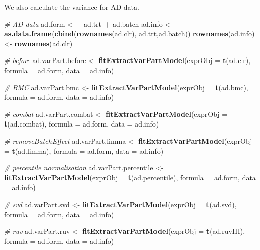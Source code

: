 \documentclass[]{book}
\newenvironment{Shaded}{\begin{snugshade}}{\end{snugshade}}
\newcommand{\KeywordTok}[1]{\textcolor[rgb]{0.13,0.29,0.53}{\textbf{#1}}}
\newcommand{\DataTypeTok}[1]{\textcolor[rgb]{0.13,0.29,0.53}{#1}}
\newcommand{\StringTok}[1]{\textcolor[rgb]{0.31,0.60,0.02}{#1}}
\newcommand{\CommentTok}[1]{\textcolor[rgb]{0.56,0.35,0.01}{\textit{#1}}}
\newcommand{\OperatorTok}[1]{\textcolor[rgb]{0.81,0.36,0.00}{\textbf{#1}}}
\newcommand{\ErrorTok}[1]{\textcolor[rgb]{0.64,0.00,0.00}{\textbf{#1}}}
\newcommand{\NormalTok}[1]{#1}
\begin{document}
We also calculate the variance for AD data.

\begin{Shaded}
\begin{Highlighting}[]
\CommentTok{# AD data}
\NormalTok{ad.form <-}\StringTok{ }\ErrorTok{~}\StringTok{ }\NormalTok{ad.trt }\OperatorTok{+}\StringTok{ }\NormalTok{ad.batch}
\NormalTok{ad.info <-}\StringTok{ }\KeywordTok{as.data.frame}\NormalTok{(}\KeywordTok{cbind}\NormalTok{(}\KeywordTok{rownames}\NormalTok{(ad.clr), ad.trt,ad.batch))}
\KeywordTok{rownames}\NormalTok{(ad.info) <-}\StringTok{ }\KeywordTok{rownames}\NormalTok{(ad.clr)}

\CommentTok{# before}
\NormalTok{ad.varPart.before <-}\StringTok{ }\KeywordTok{fitExtractVarPartModel}\NormalTok{(}\DataTypeTok{exprObj =} \KeywordTok{t}\NormalTok{(ad.clr), }
                                            \DataTypeTok{formula =}\NormalTok{ ad.form, }\DataTypeTok{data =}\NormalTok{ ad.info)}

\CommentTok{# BMC}
\NormalTok{ad.varPart.bmc <-}\StringTok{ }\KeywordTok{fitExtractVarPartModel}\NormalTok{(}\DataTypeTok{exprObj =} \KeywordTok{t}\NormalTok{(ad.bmc), }
                                         \DataTypeTok{formula =}\NormalTok{ ad.form, }\DataTypeTok{data =}\NormalTok{ ad.info)}

\CommentTok{# combat}
\NormalTok{ad.varPart.combat <-}\StringTok{ }\KeywordTok{fitExtractVarPartModel}\NormalTok{(}\DataTypeTok{exprObj =} \KeywordTok{t}\NormalTok{(ad.combat), }
                                            \DataTypeTok{formula =}\NormalTok{ ad.form, }\DataTypeTok{data =}\NormalTok{ ad.info)}

\CommentTok{# removeBatchEffect}
\NormalTok{ad.varPart.limma <-}\StringTok{ }\KeywordTok{fitExtractVarPartModel}\NormalTok{(}\DataTypeTok{exprObj =} \KeywordTok{t}\NormalTok{(ad.limma), }
                                           \DataTypeTok{formula =}\NormalTok{ ad.form, }\DataTypeTok{data =}\NormalTok{ ad.info)}

\CommentTok{# percentile normalisation}
\NormalTok{ad.varPart.percentile <-}\StringTok{ }\KeywordTok{fitExtractVarPartModel}\NormalTok{(}\DataTypeTok{exprObj =} \KeywordTok{t}\NormalTok{(ad.percentile), }
                                                \DataTypeTok{formula =}\NormalTok{ ad.form, }\DataTypeTok{data =}\NormalTok{ ad.info)}

\CommentTok{# svd}
\NormalTok{ad.varPart.svd <-}\StringTok{ }\KeywordTok{fitExtractVarPartModel}\NormalTok{(}\DataTypeTok{exprObj =} \KeywordTok{t}\NormalTok{(ad.svd), }
                                         \DataTypeTok{formula =}\NormalTok{ ad.form, }\DataTypeTok{data =}\NormalTok{ ad.info)}

\CommentTok{# ruv}
\NormalTok{ad.varPart.ruv <-}\StringTok{ }\KeywordTok{fitExtractVarPartModel}\NormalTok{(}\DataTypeTok{exprObj =} \KeywordTok{t}\NormalTok{(ad.ruvIII), }
                                         \DataTypeTok{formula =}\NormalTok{ ad.form, }\DataTypeTok{data =}\NormalTok{ ad.info)}
\end{Highlighting}
\end{Shaded}
\end{document}

